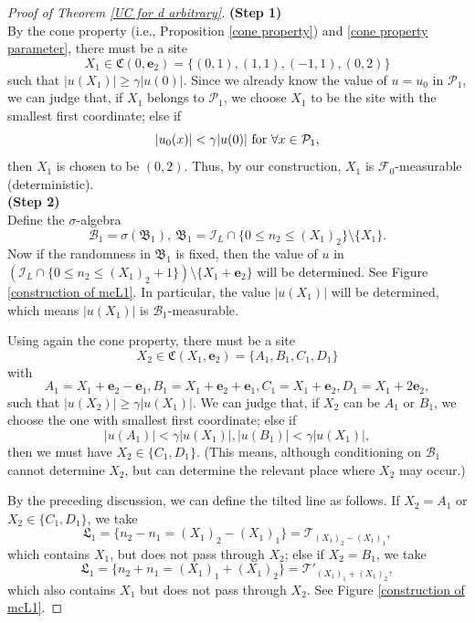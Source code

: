 \documentclass[11pt,reqno,UTF8,twoside]{amsart}
\newcommand{\bfe}{\mathbf{e}}
\newcommand{\mcB}{\mathcal{B}}
\newcommand{\mcF}{\mathcal{F}}
\newcommand{\mcP}{\mathcal{P}}
\newcommand{\mcI}{\mathcal{I}}
\newcommand{\mcT}{\mathcal{T}}
\theoremstyle{definition}
\numberwithin{equation}{section}
\begin{document}
\begin{proof}[Proof of Theorem \ref{UC for d arbitrary}]
\noindent \textbf{{(Step 1)}}\\

\noindent By the cone property (i.e., Proposition \ref{cone property})  and \eqref{cone property parameter}, there must be a site 
\[X_1\in  \mathfrak{C}(0,\bfe_2)=\{(0,1),(1,1),(-1,1),(0,2)\}\]
such that $|u(X_1)|\geq \gamma |u(0)|$. Since we already know the value of $u=u_0$ in $\mcP_1$, we can judge that, if $X_1$ belongs to   $\mcP_1$, we choose $X_1$ to be the site with the  smallest first coordinate; else if 
\[|u_0(x)|<\gamma |u(0)|\ {\rm for}\ \forall x\in \mcP_1,\]
then $X_1$ is  chosen to be $(0,2)$. Thus, by our construction,  {$X_1$ is $\mcF_0$-measurable} (deterministic).\\




\noindent \textbf{{(Step 2)}}\\

\noindent Define  the $\sigma$-algebra 
\begin{equation}\label{mcB 1}
  \mcB_1=\sigma\left( \mathfrak{B}_1 \right), \ \mathfrak{B}_1 =\mcI_L\cap \{0\leq n_2\leq (X_1)_2\} \setminus \{X_1\} .
\end{equation}
Now if the randomness in $\mathfrak{B}_1$ is fixed, then the value of $u$ in $(\mcI_L\cap \{0\leq n_2\leq (X_1)_2+1\}) \setminus \{X_1+\bfe_2\}$ will be determined.  See Figure \ref{construction of mcL1}.  In particular, the value $|u(X_1)|$ will be determined, which means  {$|u(X_1)|$ is $\mcB_1$-measurable}.

Using again the cone property, there must be a site 
\[X_2 \in  \mathfrak{C}(X_1,\bfe_2)=\{A_1,B_1,C_1,D_1\}\]
with 
\[A_1=X_1+\bfe_2-\bfe_1,B_1 =X_1+\bfe_2+\bfe_1,C_1=X_1+\bfe_2,D_1=X_1+2\bfe_2,\]
such that $|u(X_2)|\geq \gamma |u(X_1)|$. We can judge that,   if $X_2$ can be $A_1$ or $B_1$, we choose the one with smallest first coordinate; else if  
\[|u(A_1)|<\gamma |u(X_1)|,|u(B_1)|<\gamma |u(X_1)|,\]
then we must have $X_2\in \{C_1,D_1\}$. (This means, although conditioning on $\mcB_1$ cannot determine $X_2$, but can determine the relevant place where $X_2$ may occur.)

By the  preceding discussion, we can define the tilted line as follows.  If $X_2=A_1$ or $X_2\in \{C_1,D_1\}$, we take 
\[\mathfrak{L}_1= \{n_2-n_1=(X_1)_2-(X_1)_1\}=\mcT_{(X_1)_2-(X_1)_1},\]
which contains $X_1$, but does not pass through $X_2$; else if $X_2=B_1$, we take 
\[\mathfrak{L}_1= \{n_2+n_1=(X_1)_1+(X_1)_2\}=\mcT'_{(X_1)_1+(X_1)_2},\]
which also contains $X_1$ but does not pass through $X_2$. See Figure \ref{construction of mcL1}. 




\end{proof}
\end{document}
